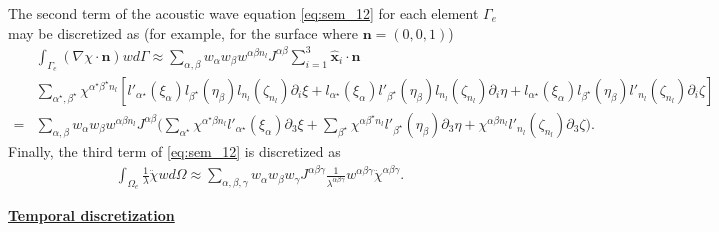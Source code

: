             The second term of the acoustic wave equation \ref{eq:sem_12} for each element $\Gamma_e$ may be discretized as (for example, for the surface where $\bm{n}=(0,0,1)$)
            \begin{align} \label{eq:sem_33}
                &\int_{\Gamma_e} (\nabla\chi\cdot\bm{n})wd\Gamma
                \approx
                \sum_{\alpha,\beta}w_{\alpha}w_{\beta}w^{\alpha\beta n_l}J^{\alpha\beta}
                \sum_{i=1}^3 \hat{\bm{x}}_i \cdot \bm{n} \nonumber \\
                &\sum_{\alpha^\star,\beta^\star}\chi^{\alpha^\star \beta^\star n_l} [
                   l'_{\alpha^\star}(\xi_{\alpha}) l_{\beta^\star} (\eta_{\beta}) l_{n_l} (\zeta_{n_l})\partial_i\xi
                + l_{\alpha^\star} (\xi_{\alpha}) l'_{\beta^\star}(\eta_{\beta}) l_{n_l} (\zeta_{n_l})\partial_i\eta
                + l_{\alpha^\star} (\xi_{\alpha}) l_{\beta^\star} (\eta_{\beta}) l'_{n_l}(\zeta_{n_l})\partial_i\zeta] \nonumber \\
                =& \sum_{\alpha,\beta}w_{\alpha}w_{\beta}w^{\alpha\beta n_l}J^{\alpha\beta}
                \bigg(\sum_{\alpha^\star}\chi^{\alpha^\star \beta n_l}l'_{\alpha^\star}(\xi_{\alpha}) \partial_3\xi+
                      \sum_{\beta^\star} \chi^{\alpha \beta^\star n_l}l'_{\beta^\star} (\eta_{\beta}) \partial_3\eta+
                                         \chi^{\alpha \beta n_l}l'_{n_l}      (\zeta_{n_l}) \partial_3\zeta\bigg).
            \end{align}
            Finally, the third term of \ref{eq:sem_12} is discretized as
            \begin{align} \label{eq:sem_34}
                \int_{\Omega_e}\frac{1}{\lambda}\ddot{\chi}wd\Omega \approx
                \sum_{\alpha,\beta,\gamma} w_{\alpha} w_{\beta} w_{\gamma} J^{\alpha\beta\gamma}
                \frac{1}{\lambda^{\alpha\beta\gamma}}w^{\alpha\beta\gamma}\ddot{\chi}^{\alpha\beta\gamma}.
            \end{align}

\noindent
        \underline{\textbf{Temporal discretization}}


